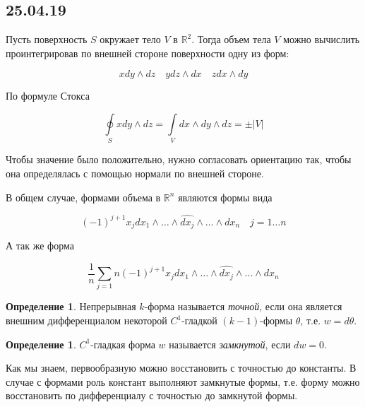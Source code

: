 \documentclass[a5paper]{article}
\newcounter{through}
\theoremstyle{plain}
\theoremstyle{definition}
\newtheorem{definition}[through]{Определение}
\numberwithin{through}{section}
\numberwithin{equation}{section}
\begin{document}


\subsection{25.04.19}

Пусть поверхность $S$ окружает тело $V$ в $\mathbb{R}^2$. Тогда объем тела $V$ можно вычислить проинтегрировав по внешней стороне поверхности одну из форм:

\begin{equation*}
	xdy \wedge dz \quad ydz \wedge dx \quad zdx \wedge dy
\end{equation*}

По формуле Стокса

\begin{equation*}
	\oint\limits_{S} xdy \wedge dz = \int\limits_{V} dx \wedge dy \wedge dz = \pm |V|
\end{equation*}

Чтобы значение было положительно, нужно согласовать ориентацию так, чтобы она определялась с помощью нормали по внешней стороне.

В общем случае, формами объема в $\mathbb{R}^n$ являются формы вида 

\begin{equation*}
	(-1)^{j+1}x_j dx_1 \wedge \ldots \wedge \widehat{dx_j} \wedge \ldots \wedge dx_n \quad j = 1 \ldots n
\end{equation*}

А так же форма

\begin{equation*}
	\frac{1}{n} \sum\limits_{j=1}{n} (-1)^{j+1}x_j dx_1 \wedge \ldots \wedge \widehat{dx_j} \wedge \ldots \wedge dx_n
\end{equation*}

\begin{definition}
	Непрерывная $k$-форма называется \textit{точной}, если она является внешним дифференциалом некоторой $C^1$-гладкой $(k-1)$-формы $\theta$, т.е. $w = d \theta$.
\end{definition}

\begin{definition}
	$C^1$-гладкая форма $w$ называется \textit{замкнутой}, если $dw=0$.
\end{definition}

Как мы знаем, первообразную можно восстановить с точностью до константы. В случае с формами роль констант выполняют замкнутые формы, т.е. форму можно восстановить по дифференциалу с точностью до замкнутой формы.
\end{document}
